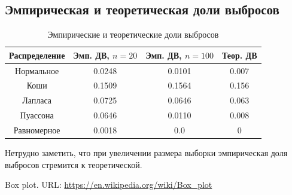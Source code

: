 \documentclass[12pt,a4paper]{article}
\begin{document}
		\subsection{Эмпирическая и теоретическая доли выбросов}
			\begin{table}[h]
				\label{th_and_emp_outburst}
				\begin{center}
					\begin{tabular}{|c|c|c|c|}
						\hline
						Распределение & Эмп. ДВ, $n=20$ & Эмп. ДВ, $n=100$ & Теор. ДВ \\ \hline
						Нормальное & 0.0248 & 0.0101 & 0.007 \\ \hline
						Коши & 0.1509 & 0.1564 & 0.156 \\ \hline
						Лапласа & 0.0725 & 0.0646 & 0.063 \\ \hline
						Пуассона & 0.0646 & 0.0110 & 0.008 \\ \hline
						Равномерное & 0.0018 & 0.0 & 0 \\ \hline
					\end{tabular}
				\end{center}
				\caption{Эмпирические и теоретические доли выбросов}
			\end{table}
			Нетрудно заметить, что при увеличении размера выборки эмпирическая доля выбросов стремится к теоретической.

	\newpage

	\begin{thebibliography}{1}
		  Box plot. URL: \url{https://en.wikipedia.org/wiki/Box_plot}
	\end{thebibliography}
\end{document}
